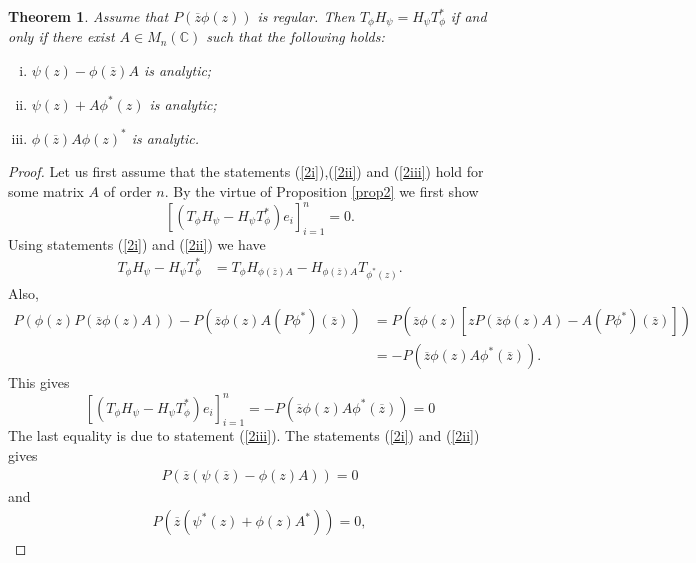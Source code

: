 \documentclass[12pt, reqno]{amsart}
\newtheorem{theorem}{Theorem}[section]
\theoremstyle{definition}
\theoremstyle{remark}
\numberwithin{equation}{section}
\begin{document}
    \begin{theorem}\label{Th2}
        Assume that $P(\overline z \phi(z))$ is regular. Then $T_\phi H_\psi =H_\psi T_\phi^*$  if and only if there exist $A\in M_n(\mathbb{C})$ such that the following holds:
        \begin{enumerate}[(i)]
            \item $\psi(z)-\phi ( \overline z)A$ is analytic;\label{2i}
            \item $\psi(z)+A\phi^*(z)$ is analytic;\label{2ii}
            \item $\phi(\overline z)A\phi(z)^*$ is analytic.\label{2iii}
       \end{enumerate}
       \end{theorem}
        \begin{proof}
             Let us first assume that the statements (\ref{2i}),(\ref{2ii}) and (\ref{2iii}) hold for some matrix $A$ of order $n.$ By the virtue of Proposition \ref{prop2} we first show
             $$
             [(T_\phi H_\psi-H_\psi T^*_\phi)e_i]_{i=1}^{n}=0.
             $$
            Using statements (\ref{2i}) and (\ref{2ii}) we have
            \begin{align*}
                T_\phi H_\psi-H_\psi T^*_\phi&=T_\phi H_{\phi(\overline z)A}-H_{\phi(\overline z)A}T_{\phi^*(z)}.
                \end{align*}
                Also,
                \begin{align*}
                P(\phi(z)P(\overline z \phi(z)A))-P(\overline{z}\phi(z)A(P\phi^*)(\overline z))
                &=P(\overline z\phi(z)[zP(\overline z \phi(z)A)-A(P\phi^*)(\overline z)])\\
                &=-P(\overline z\phi(z)A\phi^*(\overline{z})).
            \end{align*}
             This gives
            \begin{equation}\label{symbol comparision 2}
                 [(T_\phi H_\psi-H_\psi T^*_\phi)e_i]_{i=1}^{n}= -P(\overline z\phi(z)A\phi^*(\overline{z}))=0
            \end{equation}
            The last equality is due to statement (\ref{2iii}). The statements (\ref{2i}) and (\ref{2ii}) gives
            \begin{align*}
                P(\overline z (\psi(\overline z)-\phi(z)A))=0
            \end{align*}
            and 
            \begin{align*}
                P(\overline z (\psi^*( z)+\phi(z)A^*))=0,

\end{align*}
\end{proof}
\end{document}

